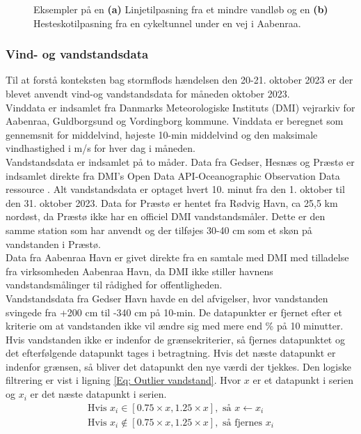 \begin{figure}[H]
\begin{subfigure}[b]{0.5\textwidth}
        \caption{}
        \label{Subfig: Hesteskotilpasning}
    \end{subfigure}
    \caption{Eksempler på en \textbf{(a)} Linjetilpasning fra et mindre vandløb og en \textbf{(b)} Hesteskotilpasning fra en cykeltunnel under en vej i Aabenraa. }
    \label{Figur: Linje- og hesteskotilpasninger}
\end{figure}

\subsubsection{Vind- og vandstandsdata} \label{Vind- og vandstandsdata}
Til at forstå konteksten bag stormflods hændelsen den 20-21. oktober 2023 er der blevet anvendt vind-og vandstandsdata for måneden oktober 2023. \\
Vinddata er indsamlet fra Danmarks Meteorologiske Instituts (DMI) vejrarkiv \citep{dmi_vejrarkiv} for Aabenraa, Guldborgsund og Vordingborg kommune. 
Vinddata er beregnet som gennemsnit for middelvind, højeste 10-min middelvind og den maksimale vindhastighed i m/s for hver dag i måneden. \\

Vandstandsdata er indsamlet på to måder. Data fra Gedser, Hesnæs og Præstø er indsamlet direkte fra DMI's Open Data API-Oceanographic Observation Data ressource \citep{dmi_open_data}. Alt vandstandsdata er optaget hvert 10. minut fra den 1. oktober til den 31. oktober 2023. Data for Præstø er hentet fra Rødvig Havn, ca 25,5 km nordøst, da Præstø ikke har en officiel DMI vandstandsmåler. Dette er den samme station som \cite{cowi_praesto_2025} har anvendt og der tilføjes 30-40 cm som et skøn på vandstanden i Præstø. \\
Data fra Aabenraa Havn er givet direkte fra en samtale med DMI med tilladelse fra virksomheden Aabenraa Havn, da DMI ikke stiller havnens vandstandsmålinger til rådighed for offentligheden. \\

Vandstandsdata fra Gedser Havn havde en del afvigelser, hvor vandstanden svingede fra +200 cm til -340 cm på 10-min. De datapunkter er fjernet efter et kriterie om at vandstanden ikke vil ændre sig med mere end \% på 10 minutter. Hvis vandstanden ikke er indenfor de grænsekriterier, så fjernes datapunktet og det efterfølgende datapunkt tages i betragtning. Hvis det næste datapunkt er indenfor grænsen, så bliver det datapunkt den nye værdi der tjekkes. Den logiske filtrering er vist i ligning \ref{Eq: Outlier vandstand}. Hvor $x$ er et datapunkt i serien og $x_i$ er det næste datapunkt i serien.
\begin{align} \label{Eq: Outlier vandstand}
    \text{Hvis } x_i \in [0.75\times x, 1.25\times x], \text{ så } x \leftarrow x_i \nonumber \\
    \text{Hvis } x_i \notin [0.75\times x, 1.25\times x], \text{ så fjernes } x_i
\end{align}

